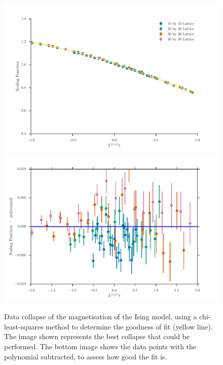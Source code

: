 \documentclass[11pt, a4paper]{report} %
\begin{document}
\begin{figure}
	\includegraphics[width=\textwidth]{ising_beta_over_nu_data_collapse.pdf}
	\includegraphics[width=\textwidth]{ising_beta_over_nu_data_collapse_residual.pdf}
	\caption{Data collapse of the magnetisation of the Ising model, using a chi-least-squares method to determine the goodness of fit (yellow line). The image shown represents the best collapse that could be performed. The bottom image shows the data points with the polynomial subtracted, to assess how good the fit is.}
	\label{fig:ising_chi_data_collapse}
\end{figure}
\end{document}
